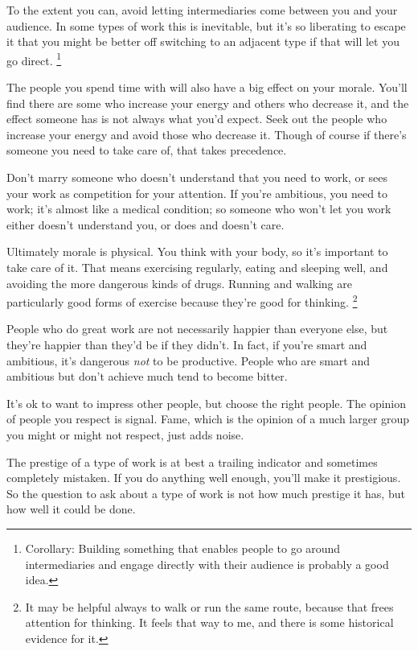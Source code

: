 \documentclass[12pt]{book}
\begin{document}
To the extent you can, avoid letting intermediaries come between you and
your audience. In some types of work this is inevitable, but it's so
liberating to escape it that you might be better off switching to an
adjacent type if that will let you go direct. \footnote{Corollary: Building something that enables people to go around
intermediaries and engage directly with their audience is probably a
good idea.}

The people you spend time with will also have a big effect on your
morale. You'll find there are some who increase your energy and others
who decrease it, and the effect someone has is not always what you'd
expect. Seek out the people who increase your energy and avoid those who
decrease it. Though of course if there's someone you need to take care
of, that takes precedence.

Don't marry someone who doesn't understand that you need to work, or
sees your work as competition for your attention. If you're ambitious,
you need to work; it's almost like a medical condition; so someone who
won't let you work either doesn't understand you, or does and doesn't
care.

Ultimately morale is physical. You think with your body, so it's
important to take care of it. That means exercising regularly, eating
and sleeping well, and avoiding the more dangerous kinds of drugs.
Running and walking are particularly good forms of exercise because
they're good for thinking. \footnote{It may be helpful always to walk or run the same route, because
that frees attention for thinking. It feels that way to me, and there is
some historical evidence for it.}

People who do great work are not necessarily happier than everyone else,
but they're happier than they'd be if they didn't. In fact, if you're
smart and ambitious, it's dangerous \emph{not} to be productive. People
who are smart and ambitious but don't achieve much tend to become
bitter.

It's ok to want to impress other people, but choose the right people.
The opinion of people you respect is signal. Fame, which is the opinion
of a much larger group you might or might not respect, just adds noise.

The prestige of a type of work is at best a trailing indicator and
sometimes completely mistaken. If you do anything well enough, you'll
make it prestigious. So the question to ask about a type of work is not
how much prestige it has, but how well it could be done.
\end{document}
